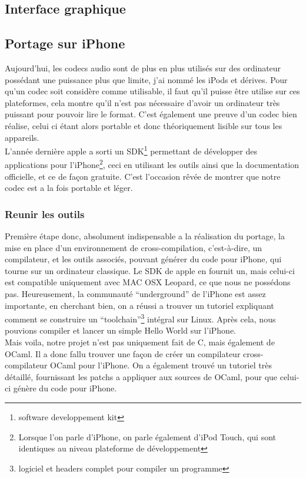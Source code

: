 \documentclass[a4paper,12pt]{article}
\begin{document}
	\subsection{Interface graphique}
	\subsection{Portage sur iPhone}
Aujourd'hui, les codecs audio sont de plus en plus utilisés sur des
ordinateur possédant une puissance plus que limite, j'ai nommé les iPods
et dérives. Pour qu'un codec soit considère comme utilisable, il faut
qu'il puisse être utilise sur ces plateformes, cela montre qu'il n'est
pas nécessaire d'avoir un ordinateur très puissant pour pouvoir lire le
format. C'est également une preuve d'un codec bien réalise, celui ci
étant alors portable et donc théoriquement lisible sur tous les
appareils.\\
L'année dernière apple a sorti un SDK\footnote{software developpement
kit} permettant de développer des applications pour l'iPhone\footnote{Lorsque
l'on parle d'iPhone, on parle également d'iPod Touch, qui sont identiques au
niveau plateforme de développement}, ceci en
utilisant les outils ainsi que la documentation officielle, et ce de façon gratuite.
C'est l'occasion rêvée de montrer que notre codec est a la fois
portable et léger.\\
		\subsubsection{Reunir les outils}
Première étape donc, absolument indispensable a la réalisation du
portage, la mise en place d'un environnement de cross-compilation,
c'est-à-dire, un compilateur, et les outils associés,  pouvant générer du code
pour iPhone, qui
tourne sur un ordinateur classique. Le SDK de apple en fournit un, mais
celui-ci est compatible uniquement avec MAC OSX Leopard, ce que nous ne
possédons pas. Heureusement, la communauté ``underground'' de l'iPhone
est assez importante, en cherchant bien, on a réussi a trouver un
tutoriel expliquant comment se construire un
``toolchain''\footnote{logiciel et headers complet pour compiler un
programme} intégral sur Linux. Après cela, nous pouvions compiler et lancer un
simple Hello World sur l'iPhone.\\
Mais voila, notre projet n'est pas uniquement fait de C, mais également
de OCaml. Il a donc fallu trouver une façon de créer un compilateur
cross-compilateur OCaml
pour l'iPhone. On a également trouvé un tutoriel très détaillé, fournissant les
patchs a appliquer aux sources de OCaml, pour que celui-ci génère du code pour
iPhone.
\end{document}
